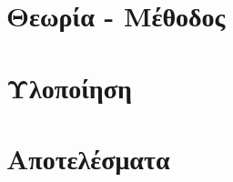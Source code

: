 \documentclass[a4paper,11pt,twoside]{book}
\author{\me}
\begin{document}
\setcounter{page}{3}


\clearemptydoublepage


\clearemptydoublepage


\clearemptydoublepage


\clearemptydoublepage


\clearemptydoublepage



\tableofcontents
\clearemptydoublepage

\setcounter{page}{1}


\clearemptydoublepage

\chapter{Θεωρία - Μέθοδος}\label{ch:chap2}

\clearemptydoublepage

\chapter{Υλοποίηση}\label{ch:chap3}

\clearemptydoublepage

\chapter{Αποτελέσματα}\label{ch:chap4}

\clearemptydoublepage

\clearemptydoublepage

\clearemptydoublepage

\listoffigures
\clearemptydoublepage
\listoftables
\clearemptydoublepage



\clearemptydoublepage


\end{document}
